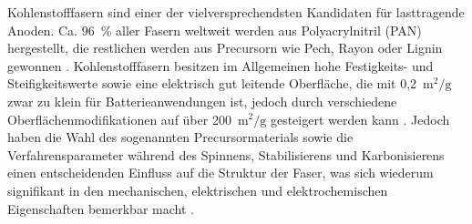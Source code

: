 


Kohlenstofffasern sind einer der vielversprechendsten Kandidaten für lasttragende Anoden. Ca. 96~\% aller Fasern weltweit werden aus Polyacrylnitril (PAN) hergestellt, die restlichen werden aus Precursorn wie Pech, Rayon oder Lignin gewonnen \cite{Das2016}. Kohlenstofffasern besitzen im Allgemeinen hohe Festigkeits- und Steifigkeitswerte sowie eine elektrisch gut leitende Oberfläche, die mit 0,2~$\si{\metre\squared\per\g}$ zwar zu klein für Batterieanwendungen ist, jedoch durch verschiedene Oberflächenmodifikationen \cite{Qian2013,Senokos2023} auf über 200~$\si{\metre\squared\per\g}$ gesteigert werden kann \cite{Zenkert2024}. Jedoch haben die Wahl des sogenannten Precursormaterials sowie die Verfahrensparameter während des Spinnens, Stabilisierens und Karbonisierens einen entscheidenden Einfluss auf die Struktur der Faser, was sich wiederum signifikant in den mechanischen, elektrischen und elektrochemischen Eigenschaften bemerkbar macht \cite{Newcomb2015}.

